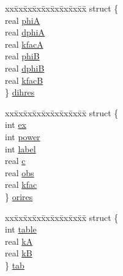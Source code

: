 \begin{DoxyCompactItemize}
\begin{tabbing}
\end{tabbing}\item 
\begin{tabbing}
xx\=xx\=xx\=xx\=xx\=xx\=xx\=xx\=xx\=\kill
struct \{\\
\>real \hyperlink{uniont__iparams_a5c5b19324d8c524116233ac74540ce52}{phiA}\\
\>real \hyperlink{uniont__iparams_ae4e379ba307b522ffc8fd33ad1e9d26a}{dphiA}\\
\>real \hyperlink{uniont__iparams_aa17e882b46390232e8e8ef9c0c1c3911}{kfacA}\\
\>real \hyperlink{uniont__iparams_ad10fa405ec35e5d43c4fec2a1354787c}{phiB}\\
\>real \hyperlink{uniont__iparams_ad410311374219bd1e98269cce7d46e0c}{dphiB}\\
\>real \hyperlink{uniont__iparams_a2f82c736106e59b80725ae4bdef19619}{kfacB}\\
\} \hyperlink{uniont__iparams_a0050b34549996e4df2fc46dbee5259cf}{dihres}\\

\end{tabbing}\item 
\begin{tabbing}
xx\=xx\=xx\=xx\=xx\=xx\=xx\=xx\=xx\=\kill
struct \{\\
\>int \hyperlink{uniont__iparams_a53c2ced6507046f818862a7c117c4264}{ex}\\
\>int \hyperlink{uniont__iparams_a6f65dd78a5a547ddd4fc7b053875d533}{power}\\
\>int \hyperlink{uniont__iparams_a1c14cb25db59e5658ce18ce068c5cdf4}{label}\\
\>real \hyperlink{uniont__iparams_a6f12f82807f6b417c8982bbb5a27af83}{c}\\
\>real \hyperlink{uniont__iparams_a0674ccf6ebac406a01809b594e7497c9}{obs}\\
\>real \hyperlink{uniont__iparams_aa2047a1076195f900b14c9a5fbc12c85}{kfac}\\
\} \hyperlink{uniont__iparams_a84131a3e49f87f93d3da7e65ba669fed}{orires}\\

\end{tabbing}\item 
\begin{tabbing}
xx\=xx\=xx\=xx\=xx\=xx\=xx\=xx\=xx\=\kill
struct \{\\
\>int \hyperlink{uniont__iparams_ae88015e9d16a950988b0b05eb90c63ce}{table}\\
\>real \hyperlink{uniont__iparams_ab13d91373ce6d97d0c3a8e7b9886b0af}{kA}\\
\>real \hyperlink{uniont__iparams_abda3baea609874bcf28f8a28b6e0a451}{kB}\\
\} \hyperlink{uniont__iparams_a4f988bcc762858fed44ed55f790de38e}{tab}\\


\end{tabbing}
\end{DoxyCompactItemize}
